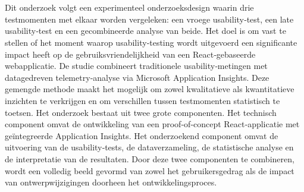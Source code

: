 
\chapter{}%
\label{ch:methodologie}

\section{}
Dit onderzoek volgt een experimenteel onderzoeksdesign waarin drie testmomenten met elkaar worden vergeleken: een vroege usability‑test, een late usability‑test en een gecombineerde analyse van beide. Het doel is om vast te stellen of het moment waarop usability‑testing wordt uitgevoerd een significante impact heeft op de gebruiksvriendelijkheid van een React‑gebaseerde webapplicatie. De studie combineert traditionele usability‑metingen met datagedreven telemetry‑analyse via Microsoft Application Insights. Deze gemengde methode maakt het mogelijk om zowel kwalitatieve als kwantitatieve inzichten te verkrijgen en om verschillen tussen testmomenten statistisch te toetsen.
Het onderzoek bestaat uit twee grote componenten. Het technisch component omvat de ontwikkeling van een proof‑of‑concept React‑applicatie met geïntegreerde Application Insights. Het onderzoekend component omvat de uitvoering van de usability‑tests, de dataverzameling, de statistische analyse en de interpretatie van de resultaten. Door deze twee componenten te combineren, wordt een volledig beeld gevormd van zowel het gebruikersgedrag als de impact van ontwerpwijzigingen doorheen het ontwikkelingsproces.


